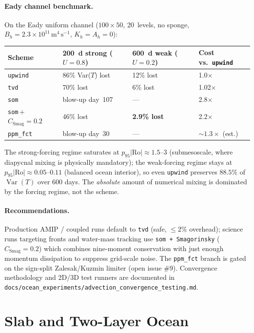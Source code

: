\documentclass[11pt,twoside]{report}
\DeclareMathOperator{\Var}{Var}
\newcommand{\Ro}{\mathrm{Ro}}
\begin{document}
\paragraph{Eady channel benchmark.}
On the Eady uniform channel ($100{\times}50$, 20~levels, no sponge,
$B_h{=}2.3{\times}10^{11}\,\mathrm{m^4\,s^{-1}}$,
$K_h{=}A_h{=}0$):
\begin{center}
\begin{tabular}{llll}
\toprule
Scheme & 200~d strong ($U{=}0.8$) & 600~d weak ($U{=}0.2$) & Cost vs.\ \texttt{upwind} \\
\midrule
\texttt{upwind}              & 86\% Var($T$) lost & 12\% lost     & 1.0$\times$ \\
\texttt{tvd}                 & 70\% lost          & 6\% lost      & 1.02$\times$ \\
\texttt{som}                 & blow-up day~107    & ---           & 2.8$\times$ \\
\texttt{som}\,+\,$C_{\mathrm{Smag}}{=}0.2$ & 46\% lost & \textbf{2.9\% lost} & 2.2$\times$ \\
\texttt{ppm\_fct}            & blow-up day~30     & ---           & ${\sim}1.3\times$ (est.) \\
\bottomrule
\end{tabular}
\end{center}
The strong-forcing regime saturates at $p_{95}|\Ro| \approx 1.5\text{--}3$
(submesoscale, where diapycnal mixing is physically mandatory); the
weak-forcing regime stays at $p_{95}|\Ro| \approx 0.05\text{--}0.11$
(balanced ocean interior), so even \texttt{upwind} preserves $88.5\%$
of $\Var(T)$ over 600 days.  The \emph{absolute} amount of numerical
mixing is dominated by the forcing regime, not the scheme.

\paragraph{Recommendations.}
Production AMIP / coupled runs default to \texttt{tvd} (safe, $\le 2\%$
overhead); science runs targeting fronts and water-mass tracking use
\texttt{som\,+\,Smagorinsky} ($C_{\mathrm{Smag}}{=}0.2$) which combines
nine-moment conservation with just enough momentum dissipation to
suppress grid-scale noise.  The \texttt{ppm\_fct} branch is gated on
the sign-split Zalesak/Kuzmin limiter (open issue \#9).  Convergence
methodology and 2D/3D test runners are documented in
\texttt{docs/ocean\_experiments/advection\_convergence\_testing.md}.


\section{Slab and Two-Layer Ocean}
\end{document}
